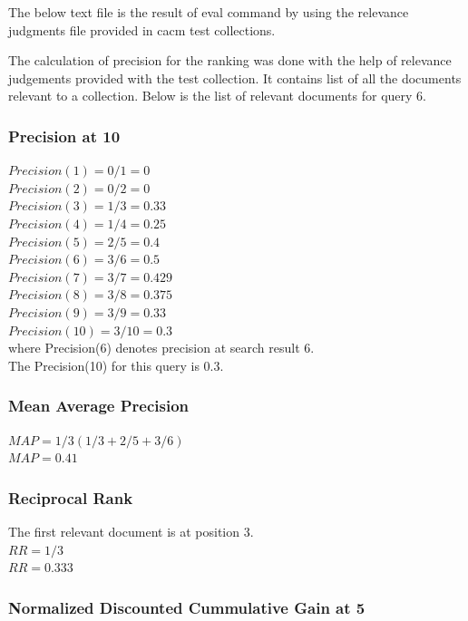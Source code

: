 \documentclass[12pt]{report}
\begin{document}
The below text file is the result of eval command by using the relevance judgments file provided in cacm test collections.


The calculation of precision for the ranking was done with the help of relevance judgements provided with the test collection. It contains list of all the documents relevant to a collection. Below is the list of relevant documents for query 6.



\subsubsection{ Precision at 10}

$Precision(1) = 0/1 = 0$\\
$Precision(2) = 0/2 = 0$\\ 
$Precision(3) = 1/3 = 0.33$\\
$Precision(4) = 1/4 = 0.25$\\
$Precision(5) = 2/5 = 0.4$\\
$Precision(6) = 3/6 = 0.5$\\
$Precision(7) = 3/7 = 0.429$\\
$Precision(8) = 3/8 = 0.375$\\
$Precision(9) = 3/9 = 0.33$\\
$Precision(10) = 3/10 = 0.3$\\
where Precision(6) denotes precision at search result 6.\\
The Precision(10) for this query is 0.3. \\  

\subsubsection{Mean Average Precision}

$MAP = 1/3 (1/3 + 2/5 + 3/6) $\\
$MAP = 0.41$
\subsubsection{Reciprocal Rank}
The first relevant document is at position 3.\\
$RR = 1/3 $\\
$RR = 0.333$\\

\subsubsection{Normalized Discounted Cummulative Gain at 5}
\end{document}
